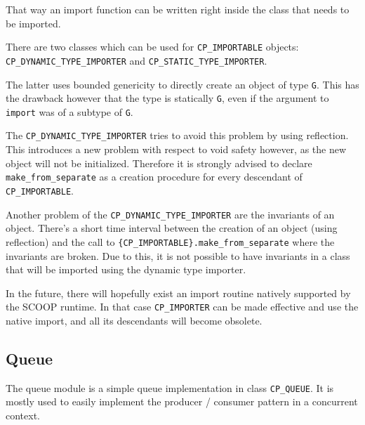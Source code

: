 That way an import function can be written right inside the class that needs to be imported.

There are two classes which can be used for \lstinline!CP_IMPORTABLE! objects: \lstinline!CP_DYNAMIC_TYPE_IMPORTER! and \lstinline!CP_STATIC_TYPE_IMPORTER!.

The latter uses bounded genericity to directly create an object of type \lstinline!G!.
This has the drawback however that the type is statically \lstinline!G!, even if the argument to \lstinline!import! was of a subtype of \lstinline!G!.

The \lstinline!CP_DYNAMIC_TYPE_IMPORTER! tries to avoid this problem by using reflection.
This introduces a new problem with respect to void safety however, as the new object will not be initialized.
Therefore it is strongly advised to declare \lstinline!make_from_separate! as a creation procedure for every descendant of \lstinline!CP_IMPORTABLE!.

Another problem of the \lstinline!CP_DYNAMIC_TYPE_IMPORTER! are the invariants of an object.
There's a short time interval between the creation of an object (using reflection) and the call to \lstinline!{CP_IMPORTABLE}.make_from_separate! where the invariants are broken.
Due to this, it is not possible to have invariants in a class that will be imported using the dynamic type importer.

In the future, there will hopefully exist an import routine natively supported by the SCOOP runtime.
In that case \lstinline!CP_IMPORTER! can be made effective and use the native import, and all its descendants will become obsolete.



\subsection{Queue}

The queue module is a simple queue implementation in class \lstinline!CP_QUEUE!.
It is mostly used to easily implement the producer / consumer pattern in a concurrent context.


